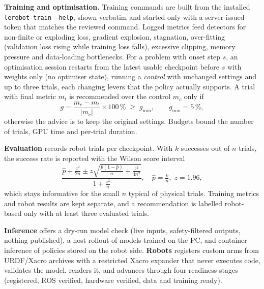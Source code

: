 \documentclass[conference]{IEEEtran}
\begin{document}
\textbf{Training and optimisation.} Training commands are built from the installed
\texttt{lerobot-train --help}, shown verbatim and started only with a server-issued token that
matches the reviewed command. Logged metrics feed detectors for non-finite or exploding loss,
gradient explosion, stagnation, over-fitting (validation loss rising while training loss falls),
excessive clipping, memory pressure and data-loading bottlenecks. For a problem with onset
step $s$, an optimisation session restarts from the latest usable checkpoint before $s$ with
weights only (no optimiser state), running a \emph{control} with unchanged settings and up to
three trials, each changing levers that the policy actually supports. A trial with final metric
$m_t$ is recommended over the control $m_c$ only if
\begin{equation}
g = \frac{m_c - m_t}{|m_c|}\times 100\,\% \;\geq\; g_{\min},\qquad g_{\min}=5\,\%,
\end{equation}
otherwise the advice is to keep the original settings. Budgets bound the number of trials, GPU
time and per-trial duration.

\textbf{Evaluation} records robot trials per checkpoint. With $k$ successes out of $n$ trials,
the success rate is reported with the Wilson score interval
\begin{equation}
\frac{\hat p + \frac{z^2}{2n} \pm z\sqrt{\frac{\hat p(1-\hat p)}{n} + \frac{z^2}{4n^2}}}{1+\frac{z^2}{n}},\quad \hat p = \tfrac{k}{n},\; z = 1.96,
\end{equation}
which stays informative for the small $n$ typical of physical trials. Training metrics and
robot results are kept separate, and a recommendation is labelled robot-based only with at
least three evaluated trials.

\textbf{Inference} offers a dry-run model check (live inputs, safety-filtered outputs, nothing
published), a host rollout of models trained on the PC, and container inference of policies
stored on the robot side. \textbf{Robots} registers custom arms from URDF/Xacro archives with a
restricted Xacro expander that never executes code, validates the model, renders it, and
advances through four readiness stages (registered, ROS verified, hardware verified, data and
training ready).
\end{document}
